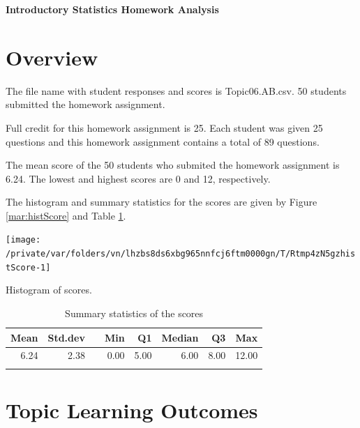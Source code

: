 \documentclass[12pt,english,nohyper]{tufte-handout}\usepackage[]{graphicx}\usepackage[]{color}
\newenvironment{knitrout}{}{} %
\begin{document}
\setcaptionfont{
  \normalfont\footnotesize
  \color{black}
}





\centerline{\Large\bf Introductory Statistics Homework Analysis}


\section{Overview}
The file name with student responses and scores is Topic06.AB.csv. 50 students submitted the homework assignment.

Full credit for this homework assignment is 25. Each student was given 25 questions and this homework assignment contains a total of 89 questions.  

The mean score of the 50 students who submited the homework assignment is 6.24. The lowest and highest scores are 0 and 12, respectively.

The histogram and summary statistics for the scores are given by Figure \ref{mar:histScore} and Table \ref{tab:summary}.

\begin{knitrout}
\color{fgcolor}\begin{marginfigure}
\texttt{[image: /private/var/folders/vn/lhzbs8ds6xbg965nnfcj6ftm0000gn/T/Rtmp4zN5gzhistScore-1]} \caption[Histogram of scores]{Histogram of scores.}\label{mar:histScore}
\end{marginfigure}


\end{knitrout}

\begin{longtable}{rrlrrrrr}
  \hline
Mean & Std.dev &   & Min & Q1 & Median & Q3 & Max \\ 
  \hline
6.24 & 2.38 &  & 0.00 & 5.00 & 6.00 & 8.00 & 12.00 \\ 
   \hline
\hline
\caption{Summary statistics of the scores} 
\label{tab:summary}
\end{longtable}


\clearpage
\newpage{}
\section{Topic Learning Outcomes}

\bigskip{}
\end{document}

